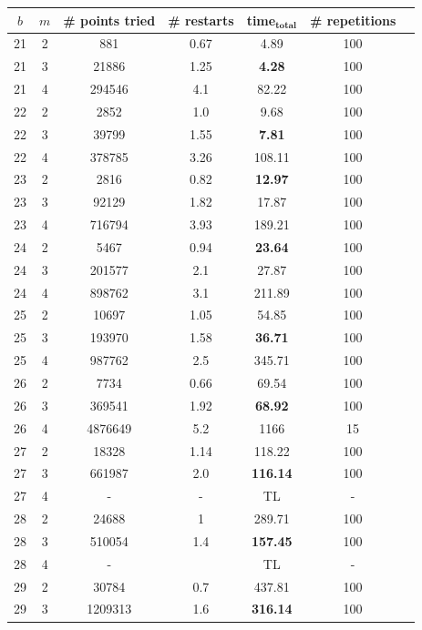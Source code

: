 \documentclass[thesis=M,english]{FITthesis}[2012/10/20]
\theoremstyle{remark}
\theoremstyle{definition}
\begin{document}
\begin{table}[H]
\centering
\begin{tabular}{ |c||c|c|c|c|c|c| } 
 \hline
$b$ & $m$ & \# points tried & \# restarts & \textbf{time}$_\textbf{total}$ & \# repetitions \\
 \hline
 \hline
21 & 2 & 881 & 0.67 & 4.89 & 100 \\ \hline
21 & 3 & 21886 & 1.25 & \textbf{4.28} & 100 \\ \hline 
21 & 4 & 294546 & 4.1 & 82.22 & 100 \\ \hline \hline 
22 & 2 & 2852 & 1.0 & 9.68 & 100 \\ \hline 
22 & 3 & 39799 & 1.55 & \textbf{7.81} & 100 \\ \hline 
22 & 4 & 378785 & 3.26 & 108.11 & 100 \\ \hline \hline
23 & 2 & 2816 & 0.82 & \textbf{12.97} & 100 \\ \hline
23 & 3 & 92129 & 1.82 & 17.87 & 100 \\ \hline
23 & 4 & 716794 & 3.93 & 189.21 & 100 \\ \hline \hline
24 & 2 & 5467 & 0.94 & \textbf{23.64 }& 100 \\ \hline 
24 & 3 & 201577 & 2.1 & 27.87 & 100 \\ \hline
24 & 4 & 898762 & 3.1 & 211.89 & 100 \\ \hline \hline
25 & 2 & 10697 & 1.05 & 54.85 & 100 \\ \hline 
25 & 3 & 193970 & 1.58 & \textbf{36.71} & 100 \\ \hline 
25 & 4 & 987762 & 2.5 & 345.71 & 100 \\ \hline \hline 
26 & 2 & 7734 & 0.66 & 69.54 & 100 \\ \hline 
26 & 3 & 369541 & 1.92 & \textbf{68.92} & 100 \\ \hline
26 & 4 & 4876649 & 5.2 & 1166 & 15 \\ \hline \hline
27 & 2 & 18328 & 1.14 & 118.22 & 100 \\ \hline 
27 & 3 & 661987 & 2.0 & \textbf{116.14} & 100 \\ \hline 
27 & 4 & - & - & TL & - \\ \hline  \hline
28 & 2 & 24688 & 1 & 289.71 & 100 \\ \hline 
28 & 3 & 510054 & 1.4 & \textbf{157.45} & 100 \\ \hline 
28 & 4 & - &  & TL & - \\ \hline \hline
29 & 2 & 30784 & 0.7 & 437.81 & 100 \\ \hline 
29 & 3 & 1209313 & 1.6 & \textbf{316.14} & 100 \\ \hline 

\end{tabular}
\end{table}
\end{document}
